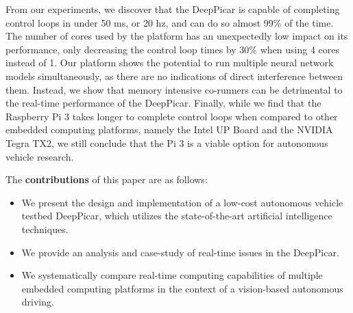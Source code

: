From our experiments, we discover that the DeepPicar is capable of 
completing control loops in under 50 ms, or 20 hz, and can do so 
almost 99\% of the time. The number of cores used by the platform has 
an unexpectedly low impact on its performance, only decreasing the 
control loop times by 30\% when using 4 cores instead of 1.  Our 
platform shows the potential to run multiple neural network models 
simultaneously, as there are no indications of direct interference 
between them. Instead, we show that memory intensive co-runners can 
be detrimental to the real-time performance of the DeepPicar. 
Finally, while we find that the Raspberry Pi 3 takes longer to 
complete control loops when compared to other embedded computing 
platforms, namely the Intel UP Board and the NVIDIA Tegra TX2, we 
still conclude that the Pi 3 is a viable option for autonomous 
vehicle research.

The {\bf contributions} of this paper are as follows:
\begin{itemize}
  \item We present the design and implementation of a
    low-cost autonomous vehicle testbed DeepPicar, which utilizes the
    state-of-the-art artificial intelligence techniques.
  \item We provide an analysis and case-study of real-time issues in the
    DeepPicar.
  \item We systematically compare real-time computing capabilities of
    multiple embedded computing platforms in the context of a
    vision-based autonomous driving.
\end{itemize}




